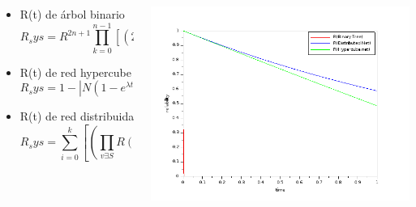 \begin{frame}
	\begin{columns}[T]
		\begin{column}{.5\textwidth}
			\begin{itemize}
				\item R(t) de árbol binario $$ R_sys = R^{2n+1} \prod_{k=0}^{n-1}{[(2^kc + 1) - 2^kcR]}$$
     		    \item R(t) de red hypercube $$ R_sys = 1 - |N(1-e^{\lambda t})|$$
     		    \item R(t) de red distribuida $$ R_sys = \sum_{i=0}^{k}{[(\prod_{v \exists S}{R(t)}) - (\prod_{\nexists S}{R(t)c})]}$$
			\end{itemize}
		\end{column}
		\begin{column}{.5\textwidth}
			\includegraphics[scale=0.3]{images/comparative_reliablities.png}
		\end{column}
	\end{columns}
\end{frame}